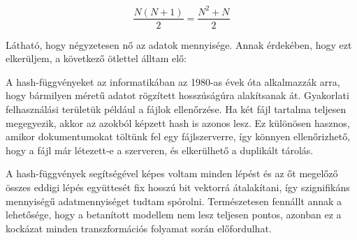 \begin{equation}\label{eq:1}
\frac{N(N+1)}{2} = \frac{N^2+N}{2}
\end{equation}

Látható, hogy négyzetesen nő az adatok mennyisége. Annak érdekében, hogy ezt elkerüljem, a következő ötlettel álltam elő:

A hash-függvényeket az informatikában az 1980-as évek óta alkalmazzák arra, hogy bármilyen méretű adatot rögzített hosszúságúra alakítsanak át. Gyakorlati felhasználási területük például a fájlok ellenőrzése. 
Ha két fájl tartalma teljesen megegyezik, akkor az azokból képzett hash is azonos lesz. 
Ez különösen hasznos, amikor dokumentumokat töltünk fel egy fájlszerverre, így könnyen ellenőrizhető, hogy a fájl már létezett-e a szerveren, és elkerülhető a duplikált tárolás.

A hash-függvények segítségével képes voltam minden lépést és az őt megelőző összes eddigi lépés együttesét fix hosszú bit vektorrá átalakítani, így szignifikáns mennyiségű adatmennyiséget tudtam spórolni.
Természetesen fennállt annak a lehetősége, hogy a betanított modellem nem lesz teljesen pontos, azonban ez a kockázat minden transzformációs folyamat során előfordulhat.

